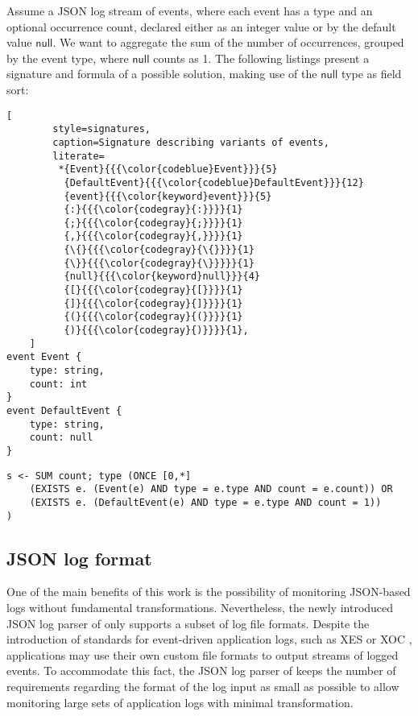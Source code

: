 \begin{example}
	\label{ex:null_match}
	Assume a JSON log stream of events, where each event has a type and an optional occurrence count, declared either as an integer value or by the default value $\mathsf{null}$. We want to aggregate the sum of the number of occurrences, grouped by the event type, where $\mathsf{null}$ counts as 1. The following listings present a signature and formula of a possible solution, making use of the $\mathsf{null}$ type as field sort:

	\begin{lstlisting}[
		style=signatures,
		caption=Signature describing variants of events,
		literate=
		 *{Event}{{{\color{codeblue}Event}}}{5}
	      {DefaultEvent}{{{\color{codeblue}DefaultEvent}}}{12}
	      {event}{{{\color{keyword}event}}}{5}
	      {:}{{{\color{codegray}{:}}}}{1}
	      {;}{{{\color{codegray}{;}}}}{1}
	      {,}{{{\color{codegray}{,}}}}{1}
	      {\{}{{{\color{codegray}{\{}}}}{1}
	      {\}}{{{\color{codegray}{\}}}}}{1}
          {null}{{{\color{keyword}null}}}{4}
	      {[}{{{\color{codegray}{[}}}}{1}
	      {]}{{{\color{codegray}{]}}}}{1}
	      {(}{{{\color{codegray}{(}}}}{1}
	      {)}{{{\color{codegray}{)}}}}{1},
	]
event Event {
	type: string,
	count: int
}
event DefaultEvent {
	type: string,
	count: null
}
	\end{lstlisting}

	\begin{lstlisting}[style=formula,caption=A formula aggregating over variants of events]
s <- SUM count; type (ONCE [0,*]
	(EXISTS e. (Event(e) AND type = e.type AND count = e.count)) OR
	(EXISTS e. (DefaultEvent(e) AND type = e.type AND count = 1))
)
	\end{lstlisting}
\end{example}

\subsection{JSON log format}
\label{sec:grammar_log}
One of the main benefits of this work is the possibility of monitoring JSON-based logs without fundamental transformations. Nevertheless, the newly introduced JSON log parser of \MonPoly only supports a subset of log file formats. Despite the introduction of standards for event-driven application logs, such as XES \cite{IEEEStandardEXtensible2016} or XOC \cite{liExtractingObjectCentricEvent2018}, applications may use their own custom file formats to output streams of logged events. To accommodate this fact, the JSON log parser of \MonPoly keeps the number of requirements regarding the format of the log input as small as possible to allow monitoring large sets of application logs with minimal transformation.

